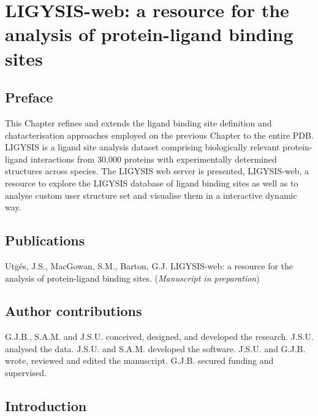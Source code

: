 \chapter{LIGYSIS-web: a resource for the analysis of protein-ligand binding sites}
\label{chap:LIGYSIS_WEB}

\section*{Preface}

This Chapter refines and extends the ligand binding site definition and chatacterisation approaches employed on the previous Chapter to the entire PDB. LIGYSIS is a ligand site analysis dataset comprising biologically relevant protein-ligand interactions from 30,000 proteins with experimentally determined structures across species. The LIGYSIS web server is presented, LIGYSIS-web, a resource to explore the LIGYSIS database of ligand binding sites as well as to analyse custom user structure set and visualise them in a interactive dynamic way.

\section*{Publications}

Utgés, J.S., MacGowan, S.M., Barton, G.J. LIGYSIS-web: a resource for the analysis of protein-ligand binding sites. (\textit{Manuscript in preparation})

\section*{Author contributions}

G.J.B., S.A.M. and J.S.U. conceived, designed, and developed the research. J.S.U. analysed the data. J.S.U. and S.A.M. developed the software. J.S.U. and G.J.B. wrote, reviewed and edited the manuscript. G.J.B. secured funding and supervised.

\section{Introduction}

